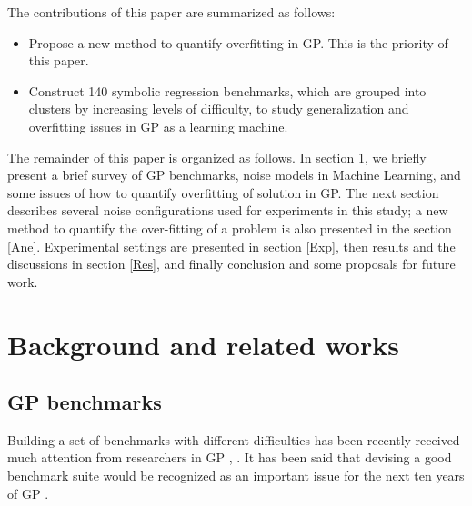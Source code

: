 The contributions of this paper are summarized as follows:
\begin{itemize}
\item Propose a new method to quantify overfitting in GP. This is the priority of this paper. %
\item Construct 140 symbolic regression benchmarks, which are grouped into clusters by increasing levels of difficulty, to study generalization and overfitting issues in GP as a learning machine.
\end{itemize} \par

The remainder of this paper is organized as follows. In section \ref{Bac}, we briefly present a brief survey of GP benchmarks, noise models in Machine Learning, and some issues of how to quantify overfitting of solution in GP.  The next section describes several noise configurations used for experiments in this study; a new method to quantify the over-fitting of a problem is also presented in the section \ref{Ane}. Experimental settings are presented in section \ref{Exp}, then results and the discussions in section \ref{Res}, and finally conclusion and some proposals for future work.
\section{Background and related works}
\label{Bac}
\subsection {GP benchmarks}
\label{GPb}
Building a set of benchmarks with different difficulties has been recently received much attention from researchers in GP \cite{2012James}, \cite{2015Mig}. It has been said that devising a good benchmark suite would be recognized as an important issue for the next ten years of GP \cite{2010O'Neill}. \par

